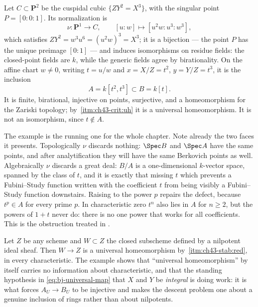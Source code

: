 \begin{example}
\label{ex:ch43-cusp-basic}
Let $C\subset\mathbf P^2$ be the cuspidal cubic
$\{ZY^2=X^3\}$, with the singular point $P=[0:0:1]$.  Its normalization
is
\[
 \nu:\mathbf P^1\longrightarrow C,
 \qquad
 [u:w]\longmapsto[u^2w:u^3:w^3],
\]
which satisfies $ZY^2=w^3u^6=(u^2w)^3=X^3$; it is a bijection --- the
point $P$ has the unique preimage $[0:1]$ --- and induces isomorphisms on residue fields: the closed-point fields
are $k$, while the generic fields agree by birationality.  On the affine chart
$w\ne0$, writing $t=u/w$ and $x=X/Z=t^2$, $y=Y/Z=t^3$, it is the
inclusion
\[
 A=k[t^2,t^3]\subset B=k[t].
\]
It is finite, birational, injective on points, surjective, and a
homeomorphism for the Zariski topology; by
\,\cref{itm:ch43-crit:uh} it is a universal
homeomorphism.  It is not an isomorphism, since $t\notin A$.

The example is the running one for the whole chapter.  Note already the two
faces it presents.  Topologically $\nu$ discards nothing: $\Spec B$ and
$\Spec A$ have the same points, and after analytification they will have
the same Berkovich points as well.  Algebraically $\nu$ discards a great
deal: $B/A$ is a one-dimensional $k$-vector space, spanned by the class
of $t$, and it is exactly that missing $t$ which prevents a Fubini--Study
function written with the coefficient $t$ from being visibly a
Fubini--Study function downstairs.  Raising to the power $p$ repairs the
defect, because $t^p\in A$ for every prime $p$.
In characteristic zero $t^n$ also lies in $A$ for $n\ge2$, but the
powers of $1+t$ never do: there is no one power that works for all
coefficients.  This is the obstruction treated in
.
\end{example}

\begin{example}
\label{ex:ch43-nilpotent-uh}
Let $Z$ be any scheme and $W\subset Z$ the closed subscheme defined by a
nilpotent ideal sheaf.  Then $W\to Z$ is a universal homeomorphism by
\,\cref{itm:ch43-stab:red}, in every
characteristic.  The example shows that ``universal homeomorphism'' by
itself carries no information about characteristic, and that the standing
hypothesis in \eqref{eq:bj-universal-map} that $X$ and $Y$ be
\emph{integral} is doing work: it is what forces $A_U\to B_U$ to be
injective and makes the descent problem one about a genuine inclusion of
rings rather than about nilpotents.
\end{example}


